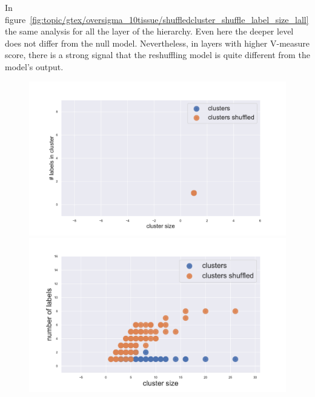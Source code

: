 In figure~\ref{fig:topic/gtex/oversigma_10tissue/shuffledcluster_shuffle_label_size_lall} the same analysis for all the layer of the hierarchy. Even here the deeper level does not differ from the null model. Nevertheless, in layers with higher V-measure score, there is a strong signal that the reshuffling model is quite different from the model's output.
\begin{figure}[htb!]
    \centering
    \begin{minipage}{0.45\textwidth}
    \includegraphics[width=0.9\linewidth]{pictures/topic/gtex/oversigma_10tissue/shuffledcluster_shuffle_label_size_l0_primary_site.pdf}
    \end{minipage}
    \hspace{3mm}
    \begin{minipage}{0.45\textwidth}
    \includegraphics[width=0.9\linewidth]{pictures/topic/gtex/oversigma_10tissue/shuffledcluster_shuffle_label_size_l1_primary_site.pdf}
    \end{minipage}
    \\
    \begin{minipage}{0.45\textwidth}

\end{minipage}
\end{figure}
